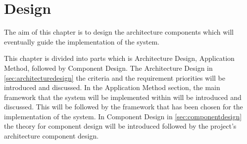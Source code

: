 \chapter{Design}\label{design}
The aim of this chapter is to design the architecture components which will eventually guide the implementation of the system.

This chapter is divided into parts which is Architecture Design, Application Method, followed by Component Design.
The Architecture Design in \cref{sec:architecturedesign} the criteria and the requirement priorities will be introduced and discussed.
In the Application Method section, the main framework that the system will be implemented within will be introduced and discussed.
This will be followed by the framework that has been chosen for the implementation of the system.
In Component Design in \cref{sec:componentdesign} the theory for component design will be introduced followed by the project's architecture component design.




